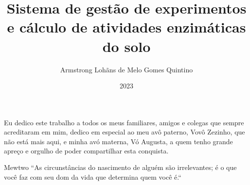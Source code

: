 \documentclass[pt,oneside,onehalfspacing,bsc]{risethesis}
\title{Sistema de gestão de experimentos e cálculo de atividades enzimáticas do solo}
\date{2023}
\author{Armstrong Lohãns de Melo Gomes Quintino}
\begin{document}
\frontmatter

\frontpage

\presentationpage

\begin{fichacatalografica}
	\FakeFichaCatalografica %
\end{fichacatalografica}

\banca


\begin{dedicatory}
Eu dedico este trabalho a todos os meus familiares, amigos e colegas que sempre acreditaram em mim, dedico em especial ao meu avô paterno, Vovô Zezinho, que não está mais aqui, e minha avó materna, Vó Augusta, a quem tenho grande apreço e orgulho de poder compartilhar esta conquista.
\end{dedicatory}

\acknowledgements


\begin{epigraph}[]{ Mewtwo}
``As circunstâncias do nascimento de alguém são irrelevantes; é o que você faz com seu dom da vida que determina quem você é.``
\end{epigraph}

\resumo


\abstract


\listoffigures

\listoftables

\listofacronyms


\tableofcontents

\mainmatter









\begin{references}
  
\end{references}


\theappendix\label{appendix}


\end{document}
